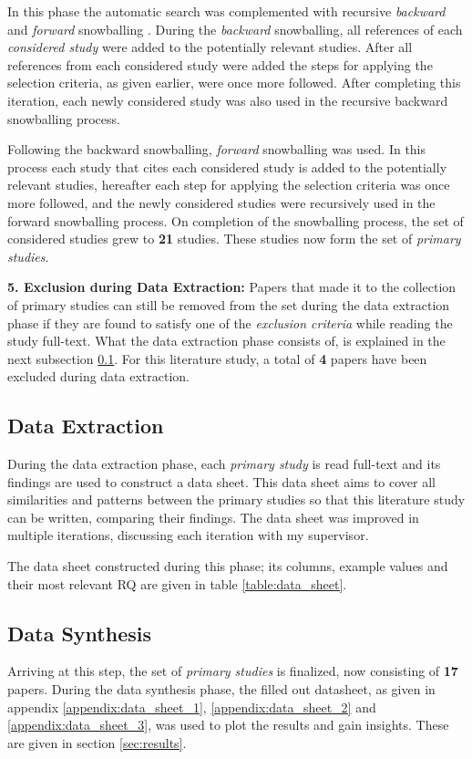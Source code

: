 In this phase the automatic search was complemented with recursive \textit{backward} and \textit{forward} snowballing \cite{wohlin2014snowballing}.
During the \textit{backward} snowballing, all references of each \textit{considered study} were added to the potentially relevant studies. 
After all references from each considered study were added the steps for applying the selection criteria, as given earlier, were once more followed. 
After completing this iteration, each newly considered study was also used in the recursive backward snowballing process.

Following the backward snowballing, \textit{forward} snowballing was used. 
In this process each study that cites each considered study is added to the potentially relevant studies, 
hereafter each step for applying the selection criteria was once more followed, 
and the newly considered studies were recursively used in the forward snowballing process.
On completion of the snowballing process, the set of considered studies grew to \textbf{21} studies.
These studies now form the set of \textit{primary studies}.

\vspace{2mm}

\noindent\textbf{5. Exclusion during Data Extraction:}
Papers that made it to the collection of primary studies can still be removed from the set during the data extraction phase if they 
are found to satisfy one of the \textit{exclusion criteria} while reading the study full-text. 
What the data extraction phase consists of, is explained in the next subsection \ref{sec:study_design:data_extract}.
For this literature study, a total of \textbf{4} papers have been excluded during data extraction. 

\subsection{Data Extraction}
\label{sec:study_design:data_extract}
During the data extraction phase, each \textit{primary study} is read full-text and its findings are used to construct a data sheet.
This data sheet aims to cover all similarities and patterns between the primary studies so that this literature study can be written, comparing their findings.
The data sheet was improved in multiple iterations, discussing each iteration with my supervisor.

The data sheet constructed during this phase; its columns, example values and their most relevant RQ are given in table \ref{table:data_sheet}.

\subsection{Data Synthesis}
\label{sec:study_design:data_synth}
Arriving at this step, the set of \textit{primary studies} is finalized, now consisting of \textbf{17} papers.
During the data synthesis phase, the filled out datasheet, 
as given in appendix \ref{appendix:data_sheet_1}, \ref{appendix:data_sheet_2} and \ref{appendix:data_sheet_3}, 
was used to plot the results and gain insights.
These are given in section \ref{sec:results}.